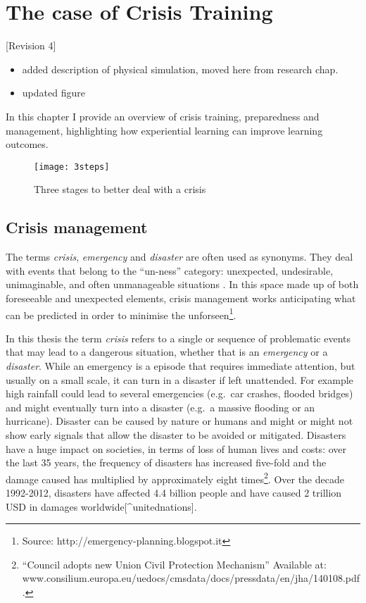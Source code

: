 \chapter{The case of Crisis Training}\label{crisis}

{[}Revision 4{]}

\begin{itemize}
\itemsep1pt\parskip0pt
\item
  added description of physical simulation, moved here from research
  chap.
\item
  updated figure
\end{itemize}

In this chapter I provide an overview of crisis training, preparedness
and management, highlighting how experiential learning can improve
learning outcomes.

\begin{figure}[h!]
    \centering
    \texttt{[image: 3steps]}
    \caption{Three stages to better deal with a crisis}
    \label{fig:three-stages}
\end{figure}


\section{Crisis management}\label{crisis-management}

The terms \emph{crisis}, \emph{emergency} and \emph{disaster} are often
used as synonyms. They deal with events that belong to the ``un-ness''
category: unexpected, undesirable, unimaginable, and often unmanageable
situations \autocites{Boin:2007wt}{hewit}. In this space made up of both
foreseeable and unexpected elements, crisis management works
anticipating what can be predicted in order to minimise the
unforseen\footnote{Source: http://emergency-planning.blogspot.it}.

In this thesis the term \emph{crisis} refers to a single or sequence of
problematic events that may lead to a dangerous situation, whether that
is an \emph{emergency} or a \emph{disaster}. While an emergency is a
episode that requires immediate attention, but usually on a small scale,
it can turn in a disaster if left unattended. For example high rainfall
could lead to several emergencies (e.g.~car crashes, flooded bridges)
and might eventually turn into a disaster (e.g.~a massive flooding or an
hurricane). Disaster can be caused by nature or humans and might or
might not show early signals that allow the disaster to be avoided or
mitigated. Disasters have a huge impact on societies, in terms of loss
of human lives and costs: over the last 35 years, the frequency of
disasters has increased five-fold and the damage caused has multiplied
by approximately eight times\footnote{``Council adopts new Union Civil
  Protection Mechanism'' Available at:
  www.consilium.europa.eu/uedocs/cmsdata/docs/pressdata/en/jha/140108.pdf.}.
Over the decade 1992-2012, disasters have affected 4.4 billion people
and have caused 2 trillion USD in damages
worldwide{[}\^{}unitednations{]}.


